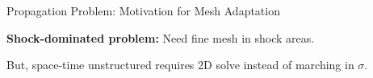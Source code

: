 \documentclass{beamer}
\newcounter{sectionframecount}
\begin{document}
\begin{frame}[t]{Propagation Problem: Motivation for Mesh Adaptation}

\textbf{Shock-dominated problem:} Need fine mesh in shock areas.

{
}

{
\begin{minipage}[t]{1\linewidth}
  \vspace{4.9cm}
  But, space-time unstructured requires 2D solve instead of marching in $\sigma$.
\end{minipage}
}

\end{frame}

\end{document}
